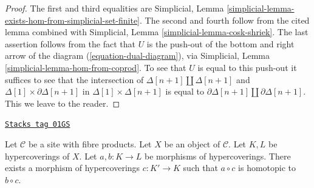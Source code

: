 \begin{proof}
The first and third equalities are
Simplicial, Lemma \ref{simplicial-lemma-exists-hom-from-simplicial-set-finite}.
The second and fourth follow from the cited lemma combined with
Simplicial, Lemma \ref{simplicial-lemma-cosk-shriek}.
The last assertion follows from the fact that
$U$ is the push-out of the bottom and right arrow of the
diagram (\ref{equation-dual-diagram}), via
Simplicial, Lemma \ref{simplicial-lemma-hom-from-coprod}.
To see that $U$ is equal to this push-out it suffices
to see that the intersection of
$\Delta[n + 1] \amalg \Delta[n + 1]$ and
$\Delta[1] \times \partial\Delta[n + 1]$
in $\Delta[1] \times \Delta[n + 1]$ is equal to
$\partial\Delta[n + 1] \amalg \partial\Delta[n + 1]$.
This we leave to the reader.
\end{proof}

\begin{lemma}[Homotopy]
\label{hypercovering-lemma-homotopy}
\href{https://stacks.math.columbia.edu/tag/01GS}{\texttt{Stacks tag 01GS}}

Let $\mathcal{C}$ be a site with fibre products.
Let $X$ be an object of $\mathcal{C}$.
Let $K, L$ be hypercoverings of $X$.
Let $a, b : K \to L$ be morphisms of hypercoverings.
There exists a morphism of hypercoverings
$c : K' \to K$ such that $a \circ c$ is homotopic
to $b \circ c$.
\end{lemma}

